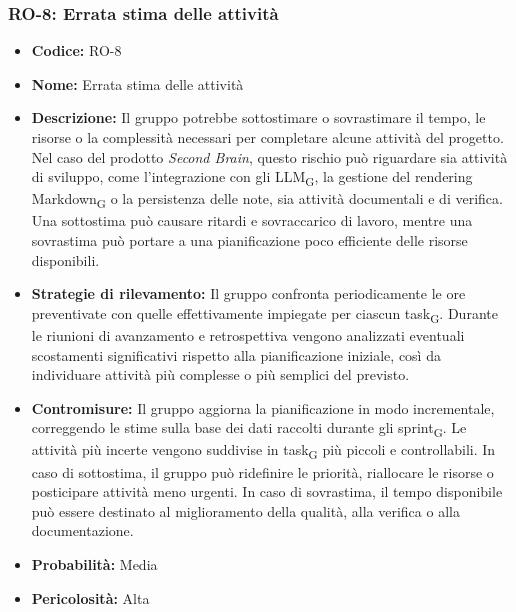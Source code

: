 \documentclass[a4paper, 10pt, colorlinks=true, linkcolor=black, urlcolor=blue, citecolor=blue, hidelinks]{article}
\begin{document}
\subsubsection{RO-8: Errata stima delle attività}

\begin{itemize}
    \item \textbf{Codice:} RO-8

    \item \textbf{Nome:} Errata stima delle attività

    \item \textbf{Descrizione:} Il gruppo potrebbe sottostimare o sovrastimare il tempo, le risorse o la complessità necessari per completare alcune attività del progetto. Nel caso del prodotto \textit{Second Brain}, questo rischio può riguardare sia attività di sviluppo, come l'integrazione con gli LLM\textsubscript{G}, la gestione del rendering Markdown\textsubscript{G} o la persistenza delle note, sia attività documentali e di verifica. Una sottostima può causare ritardi e sovraccarico di lavoro, mentre una sovrastima può portare a una pianificazione poco efficiente delle risorse disponibili.

    \item \textbf{Strategie di rilevamento:} Il gruppo confronta periodicamente le ore preventivate con quelle effettivamente impiegate per ciascun task\textsubscript{G}. Durante le riunioni di avanzamento e retrospettiva vengono analizzati eventuali scostamenti significativi rispetto alla pianificazione iniziale, così da individuare attività più complesse o più semplici del previsto.

    \item \textbf{Contromisure:} Il gruppo aggiorna la pianificazione in modo incrementale, correggendo le stime sulla base dei dati raccolti durante gli sprint\textsubscript{G}. Le attività più incerte vengono suddivise in task\textsubscript{G} più piccoli e controllabili. In caso di sottostima, il gruppo può ridefinire le priorità, riallocare le risorse o posticipare attività meno urgenti. In caso di sovrastima, il tempo disponibile può essere destinato al miglioramento della qualità, alla verifica o alla documentazione.

    \item \textbf{Probabilità:} Media

    \item \textbf{Pericolosità:} Alta
\end{itemize}
\end{document}
